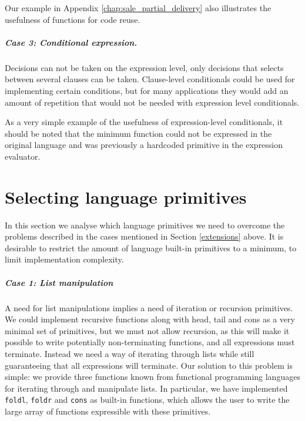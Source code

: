 \documentclass[10pt,a4paper,final,oneside,openany,article]{memoir}
\begin{document}
Our example in Appendix \ref{chap:sale_partial_delivery} also
illustrates the usefulness of functions for code reuse.

\paragraph{Case 3: Conditional expression.} Decisions can not be taken
on the expression level, only decisions that selects between several
clauses can be taken. Clause-level conditionals could be used for
implementing certain conditions, but for many applications they would
add an amount of repetition that would not be needed with expression
level conditionals.

As a very simple example of the usefulness of expression-level
conditionals, it should be noted that the minimum function could not
be expressed in the original language and was previously a hardcoded
primitive in the expression evaluator.

\chapter{Selecting language primitives}
\label{primitives}
In this section we analyse which language primitives we need to
overcome the problems described in the cases mentioned in
Section \ref{extensions} above. It is desirable to restrict the amount of
language built-in primitives to a minimum, to limit implementation
complexity.

\paragraph{Case 1: List manipulation}
A need for list manipulations implies a need of iteration or recursion
primitives. We could implement recursive functions along with head,
tail and cons as a very minimal set of primitives, but we must not
allow recursion, as this will make it possible to write potentially
non-terminating functions, and all expressions must terminate. Instead
we need a way of iterating through lists while still guaranteeing that
all expressions will terminate. Our solution to this problem is simple:
we provide three functions known from functional programming languages
for iterating through and manipulate lists. In particular, we have
implemented \lstinline{foldl}, \lstinline{foldr} and \lstinline{cons} as
built-in functions, which allows the user to write the large array of
functions expressible with these primitives.
\end{document}
